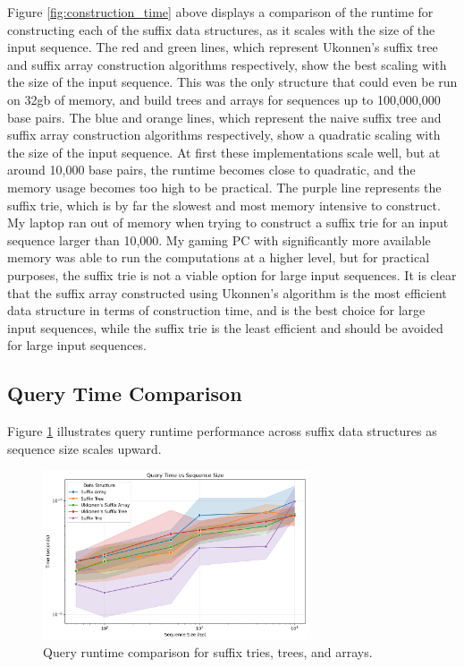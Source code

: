 \documentclass[11pt, letterpaper]{article}
\begin{document}
Figure \ref{fig:construction_time} above displays a comparison of the runtime for constructing each of the suffix data structures, as it scales with the size of the input sequence.
The red and green lines, which represent Ukonnen's suffix tree and suffix array construction algorithms respectively, show the best scaling with the size of the input sequence.
This was the only structure that could even be run on 32gb of memory, and build trees and arrays for sequences up to 100,000,000 base pairs.
The blue and orange lines, which represent the naive suffix tree and suffix array construction algorithms respectively, show a quadratic scaling with the size of the input sequence.
At first these implementations scale well, but at around 10,000 base pairs, the runtime becomes close to quadratic, and the memory usage becomes too high to be practical.
The purple line represents the suffix trie, which is by far the slowest and most memory intensive to construct. My laptop ran out of memory when trying to construct a suffix trie for an input sequence larger than 10,000.
My gaming PC with significantly more available memory was able to run the computations at a higher level, but for practical purposes, the suffix trie is not a viable option for large input sequences.
It is clear that the suffix array constructed using Ukonnen's algorithm is the most efficient data structure in terms of construction time, and is the best choice for large input sequences,
while the suffix trie is the least efficient and should be avoided for large input sequences. \\

\newpage
\subsection{Query Time Comparison}

Figure \ref{fig:query_time} illustrates query runtime performance across suffix data structures as sequence size scales upward.

\begin{figure}[ht]
  \centering
  \includegraphics[width=0.7\textwidth]{../figures/query_time_by_size.png}
  \caption{Query runtime comparison for suffix tries, trees, and arrays.}
  \label{fig:query_time}
\end{figure}
\end{document}
